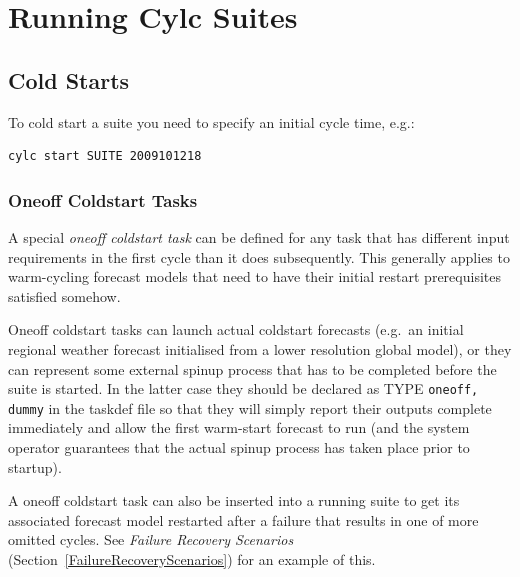 \documentclass[11pt,a4paper]{article}
\begin{document}

%
%
%

\lstset{language=}


\pagebreak
\section{Running Cylc Suites}
\label{RunningCylcSuites}

\subsection{Cold Starts}

To cold start a suite you need to specify an initial cycle time, e.g.:

\begin{lstlisting}
cylc start SUITE 2009101218
\end{lstlisting}

\subsubsection{Oneoff Coldstart Tasks}

A special {\em oneoff coldstart task} can be defined for any task
that has different input requirements in the first cycle than it does
subsequently. This generally applies to warm-cycling forecast models
that need to have their initial restart prerequisites satisfied somehow. 

Oneoff coldstart tasks can launch actual coldstart forecasts (e.g.\ an
initial regional weather forecast initialised from a lower resolution
global model), or they can represent some external spinup process that
has to be completed before the suite is started. In the latter case
they should be declared as TYPE \lstinline=oneoff, dummy= in the taskdef
file so that they will simply report their outputs complete immediately
and allow the first warm-start forecast to run (and the system operator
guarantees that the actual spinup process has taken place prior to
startup).

A oneoff coldstart task can also be inserted into a running suite to
get its associated forecast model restarted after a failure that results
in one of more omitted cycles. See {\em Failure Recovery Scenarios}
(Section~\ref{FailureRecoveryScenarios}) for an example of this. 
\end{document}
